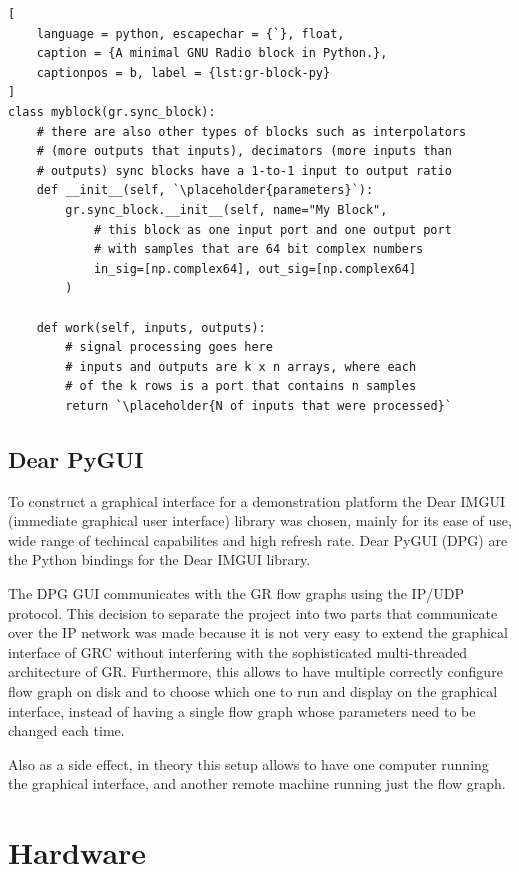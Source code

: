 {\newcommand{\placeholder}[1]{\textit{\(\langle\)\,\textrm{#1}\,\(\rangle\)}}
\begin{lstlisting}[
	language = python, escapechar = {`}, float,
	caption = {A minimal GNU Radio block in Python.},
	captionpos = b, label = {lst:gr-block-py}
]
class myblock(gr.sync_block):
	# there are also other types of blocks such as interpolators 
	# (more outputs that inputs), decimators (more inputs than 
	# outputs) sync blocks have a 1-to-1 input to output ratio
	def __init__(self, `\placeholder{parameters}`):
		gr.sync_block.__init__(self, name="My Block",
			# this block as one input port and one output port
			# with samples that are 64 bit complex numbers
			in_sig=[np.complex64], out_sig=[np.complex64]
		)

	def work(self, inputs, outputs):
		# signal processing goes here
		# inputs and outputs are k x n arrays, where each
		# of the k rows is a port that contains n samples
		return `\placeholder{N of inputs that were processed}`
\end{lstlisting}}

\subsection{Dear PyGUI}

To construct a graphical interface for a demonstration platform the Dear IMGUI (immediate graphical user interface) library was chosen, mainly for its ease of use, wide range of techincal capabilites and high refresh rate. Dear PyGUI (DPG) are the Python bindings for the Dear IMGUI library.

The DPG GUI communicates with the GR flow graphs using the IP/UDP protocol. This decision to separate the project into two parts that communicate over the IP network was made because it is not very easy to extend the graphical interface of GRC without interfering with the sophisticated multi-threaded architecture of GR. Furthermore, this allows to have multiple correctly configure flow graph on disk and to choose which one to run and display on the graphical interface, instead of having a single flow graph whose parameters need to be changed each time.

Also as a side effect, in theory this setup allows to have one computer running the graphical interface, and another remote machine running just the flow graph.

\section{Hardware}

